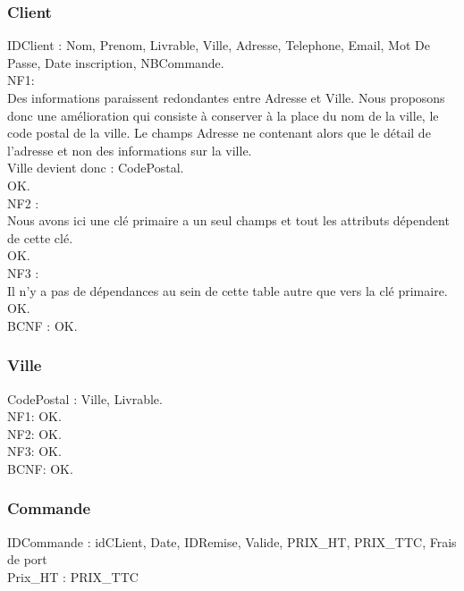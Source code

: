 \documentclass[a4paper, 12pt]{report}
\begin{document}
\begin{spacing}{1.2}
\textcolor{colortitre3}{\subsubsection*{\hypertarget{CLient}{Client}}}
    
IDClient : Nom, Prenom, Livrable, Ville, Adresse, Telephone, Email, Mot De Passe, Date inscription, NBCommande.\\

NF1:\\
Des informations paraissent redondantes entre Adresse et Ville. Nous proposons donc une amélioration qui consiste à conserver à la place du nom de la ville, le code postal de la ville. Le champs Adresse ne contenant alors que le détail de l'adresse et non des informations sur la ville.\\
Ville devient donc : CodePostal.
\\OK.\\
NF2 : \\
Nous avons ici une clé primaire a un seul champs et tout les attributs dépendent de cette clé. \\OK.\\
NF3 : \\
Il n'y a pas de dépendances au sein de cette table autre que vers la clé primaire.\\ OK. \\
BCNF : OK.\\

\textcolor{colortitre3}{\subsubsection*{\hypertarget{Ville}{Ville}}}

CodePostal : Ville, Livrable.\\

NF1: OK.\\
NF2: OK.\\
NF3: OK.\\
BCNF: OK.\\

\textcolor{colortitre3}{\subsubsection*{\hypertarget{Commande}{Commande}}}

IDCommande : idCLient, Date, IDRemise, Valide, PRIX\_HT, PRIX\_TTC, Frais de port\\
Prix\_HT : PRIX\_TTC\\


\end{spacing}
\end{document}
